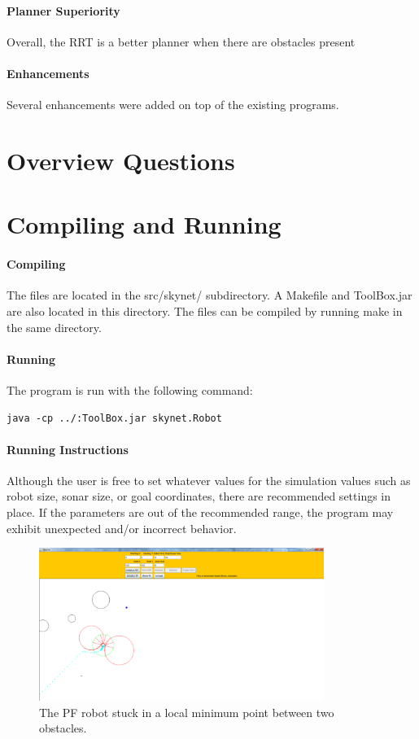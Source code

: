 \documentclass[12pt]{article}
\begin{document}
\paragraph*{Planner Superiority}
Overall, the RRT is a better planner when there are obstacles present
\paragraph*{Enhancements}
Several enhancements were added on top of the existing programs. 

\section{Overview Questions}

\section{Compiling and Running}
\paragraph*{Compiling}
The files are located in the src/skynet/ subdirectory. A Makefile and ToolBox.jar are also located in this directory. The files can be compiled by running make in the same directory. 
\paragraph*{Running}
The program is run with the following command:
\begin{lstlisting}
java -cp ../:ToolBox.jar skynet.Robot
\end{lstlisting}
\paragraph*{Running Instructions}
Although the user is free to set whatever values for the simulation values such as robot size, sonar size, or goal coordinates, there are recommended settings in place. If the parameters are out of the recommended range, the program may exhibit unexpected and/or incorrect behavior.


\begin{figure}
\centering
\includegraphics[width=350]{two_obstacles.png}
\caption{The PF robot stuck in a local minimum point between two obstacles.}
\end{figure}
\end{document}
